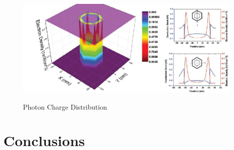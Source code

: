\begin{figure}
  \caption{Photon Charge Distribution}
  \centering
  \includegraphics[width=\textwidth]{pictures/ED/Photoncharge}
  \label{PhotonCharge}
\end{figure}

\section{Conclusions} \label{sec:conclusions}

